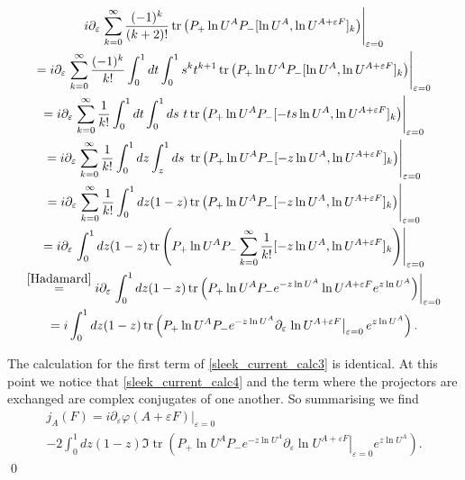 \documentclass[b5paper,draft,openbib,12pt]{memoir}
\DeclareMathOperator{\tr}{tr}
\begin{document}
\begin{multline}\label{sleek_current_calc4}
 i  \partial_{\varepsilon} \left.\sum_{k=0}^\infty \frac{(-1)^k}{(k+2)!}  \tr\left(P_+ \ln U^A P_-[\ln U^A,\ln U^{A+\varepsilon F} ]_{k}\right) \right|_{\varepsilon=0}\\
= i  \partial_{\varepsilon} \left.\sum_{k=0}^\infty \frac{(-1)^k}{k!} \int_0^1 d t \int_0^1 s^k t^{k+1}
\tr\left(P_+ \ln U^A P_-[\ln U^A,\ln U^{A+\varepsilon F} ]_{k}\right) \right|_{\varepsilon=0}\\
= i  \partial_{\varepsilon} \left.\sum_{k=0}^\infty \frac{1}{k!} \int_0^1 d t \int_0^1 ds\ t
\tr\left(P_+ \ln U^A P_-[ -t s \ln U^A,\ln U^{A+\varepsilon F} ]_{k}\right) \right|_{\varepsilon=0}\\
= i  \partial_{\varepsilon} \left.\sum_{k=0}^\infty \frac{1}{k!} \int_0^1 d z \int_z^1 ds\ 
\tr\left(P_+ \ln U^A P_-[ -z \ln U^A,\ln U^{A+\varepsilon F} ]_{k}\right) \right|_{\varepsilon=0}\\
= i  \partial_{\varepsilon} \left.\sum_{k=0}^\infty \frac{1}{k!} \int_0^1 d z (1-z)
\tr\left(P_+ \ln U^A P_-[ -z \ln U^A,\ln U^{A+\varepsilon F} ]_{k}\right) \right|_{\varepsilon=0}\\
= i  \partial_{\varepsilon} \left. \int_0^1 d z (1-z) 
\tr\left(P_+ \ln U^A P_- \sum_{k=0}^\infty \frac{1}{k!} [ -z \ln U^A,\ln U^{A+\varepsilon F} ]_{k}\right) \right|_{\varepsilon=0}\\
\stackrel{\eqref{Hadamard}}{=} i  \partial_{\varepsilon} \left. \int_0^1 d z (1-z) 
\tr\left(P_+ \ln U^A P_- e^{ -z \ln U^A}\ln U^{A+\varepsilon F} e^{ z \ln U^A}\right) \right|_{\varepsilon=0}\\
=i  \int_0^1 d z (1-z) 
\tr\left(P_+ \ln U^A P_- e^{ -z \ln U^A} \partial_{\varepsilon} \left. \ln U^{A+\varepsilon F}\right|_{\varepsilon=0} e^{ z \ln U^A}\right) .
\end{multline}

The calculation for the first term of \eqref{sleek_current_calc3} is identical.
At this point we notice that \eqref{sleek_current_calc4} and the term where the 
projectors are exchanged are complex conjugates of one another. So summarising we find
\begin{multline*}
j_A(F)=i \partial_{\varepsilon} \left. \varphi (A+\varepsilon F) \right|_{\varepsilon=0}\\
-2\int_0^1 d z (1-z)  \Im \tr\left(P_+ \ln U^A P_- e^{ -z \ln U^A} \partial_{\varepsilon} \left. \ln U^{A+\varepsilon F}\right|_{\varepsilon=0} e^{ z \ln U^A}\right).
\end{multline*}
\qed
\end{document}
